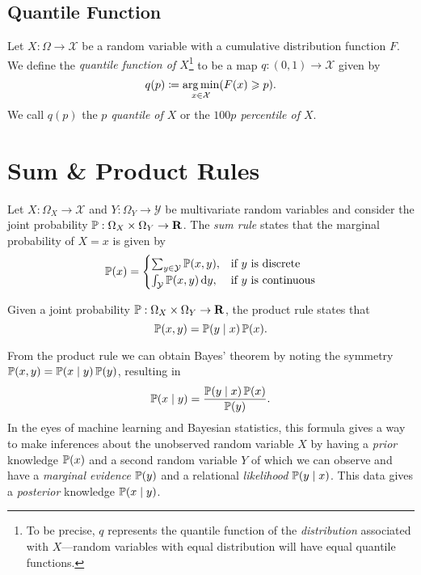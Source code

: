 \subsection{Quantile Function}

\begin{definition}
\label{def:quantile-percentile}
Let \(X: \Omega \to \mathcal{X}\) be a random variable with a cumulative
distribution function \(F\). We define the \emph{quantile function of
  \(X\)}\footnote{To be precise, \(q\) represents the quantile function of the
  \emph{distribution} associated with \(X\)---random variables with equal
  distribution will have equal quantile functions.} to be a map
\(q: (0, 1) \to \mathcal{X}\) given by
\[
q(p) \coloneq \operatorname*{arg\,min}_{x \in \mathcal{X}} (F(x) \geqslant p).
\]
We call \(q(p)\) the \emph{\(p\) quantile of \(X\)} or the \emph{\(100 p\)
  percentile of \(X\)}.
\end{definition}

\section{Sum \& Product Rules}

\begin{lemma}
\label{lem:joint-probability-sum-rule}
Let \(X: \Omega_X \to \mathcal{X}\) and \(Y: \Omega_Y \to \mathcal{Y}\) be
multivariate random variables and consider the joint probability
\(\operatorname{\mathbb{P}}: \Omega_X \times \Omega_Y \to \mathbf{R}\). The \emph{sum rule}
states that the marginal probability of \(X = x\) is given by
\[
\operatorname{\mathbb{P}}(x) =
\begin{cases}
  \sum_{y \in \mathcal{Y}} \operatorname{\mathbb{P}}(x, y), &\text{if } y \text{ is discrete} \\
  \int_{\mathcal{Y}} \operatorname{\mathbb{P}}(x, y)\, \mathrm{d} y, &\text{if } y \text{ is continuous}
\end{cases}
\]
\end{lemma}

\begin{lemma}
\label{lem:joint-probability-product-rule}
Given a joint probability \(\operatorname{\mathbb{P}}: \Omega_X \times \Omega_Y \to \mathbf{R}\), the product
rule states that
\[
\operatorname{\mathbb{P}}(x, y) = \operatorname{\mathbb{P}}(y \mid x) \operatorname{\mathbb{P}}(x).
\]
\end{lemma}

From the product rule we can obtain Bayes' theorem by noting the symmetry
\(\operatorname{\mathbb{P}}(x, y) = \operatorname{\mathbb{P}}(x \mid y) \operatorname{\mathbb{P}}(y)\), resulting in
\[
\operatorname{\mathbb{P}}(x \mid y) = \frac{\operatorname{\mathbb{P}}(y \mid x) \operatorname{\mathbb{P}}(x)}{\operatorname{\mathbb{P}}(y)}.
\]
In the eyes of machine learning and Bayesian statistics, this formula gives a
way to make inferences about the unobserved random variable \(X\) by having a
\emph{prior} knowledge \(\operatorname{\mathbb{P}}(x)\) and a second random variable \(Y\) of which we
can observe and have a \emph{marginal evidence} \(\operatorname{\mathbb{P}}(y)\) and a relational
\emph{likelihood} \(\operatorname{\mathbb{P}}(y \mid x)\). This data gives a \emph{posterior} knowledge
\(\operatorname{\mathbb{P}}(x \mid y)\).

